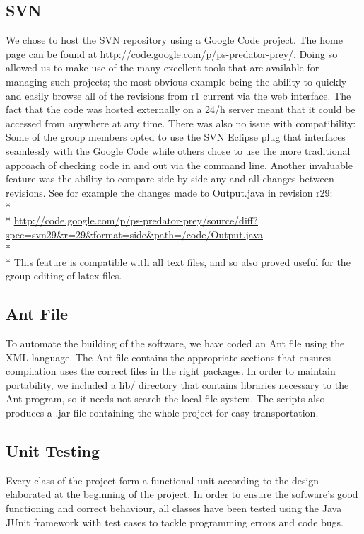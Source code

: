 \documentclass[11pt]{report}
\begin{document}
      \subsection{SVN} %
	We chose to host the SVN repository using a Google Code project. The home page can be found at \href{http://code.google.com/p/ps-predator-prey/}{http://code.google.com/p/ps-predator-prey/}. Doing so allowed us to make use of the many excellent tools that are available for managing such projects; the most obvious example being the ability to quickly and easily browse all of the revisions from r1 current via the web interface.  The fact that the code was hosted externally on a 24/h server meant that it could be accessed from anywhere at any time. There was also no issue with compatibility: Some of the group members opted to use the SVN Eclipse plug that interfaces seamlessly with the Google Code while others chose to use the more traditional approach of checking code in and out via the command line. Another invaluable feature was the ability to compare side by side any and all changes between revisions. See for example the changes made to Output.java in revision r29:\\* \\*
	 \href{http://code.google.com/p/ps-predator-prey/source/diff?spec=svn29&r=29&format=side&path=/code/Output.java}{http://code.google.com/p/ps-predator-prey/source/diff?spec=svn29&r=29&format=side&path=/code/Output.java} \\* \\*
	 This feature is compatible with all text files, and so also proved useful for the group editing of latex files.	      
      
      \subsection{Ant File} %
To automate the building of the software, we have coded an Ant file using the XML language. The Ant file contains the appropriate sections that ensures compilation uses the correct files in the right packages. In order to maintain portability, we included a lib/ directory that contains libraries necessary to the Ant program, so it needs not search the local file system. The scripts also produces a .jar file containing the whole project for easy transportation.  
 
      \subsection{Unit Testing} %
      Every class of the project form a functional unit according to the design elaborated at the beginning of the project. In order to ensure the software's good functioning and correct behaviour, all classes have been tested using the Java JUnit framework with test cases to tackle programming errors and code bugs.
\end{document}
